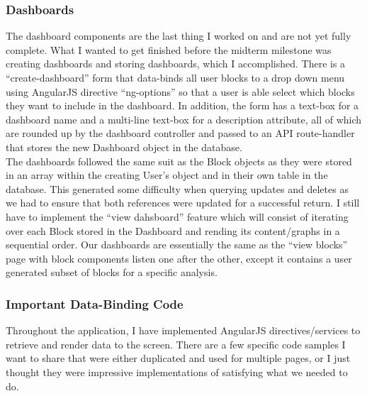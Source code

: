 \documentclass[letterpaper,10pt,serif,draftclsnofoot,onecolumn,compsoc,titlepage]{IEEEtran}
\begin{document}
\subsubsection{Dashboards} 
The dashboard components are the last thing I worked on and are not yet fully complete. What I wanted to get finished before the midterm milestone was creating dashboards and storing dashboards, which I accomplished. There is a ``create-dashboard'' form that data-binds all user blocks to a drop down menu using AngularJS directive ``ng-options'' so that a user is able select which blocks they want to include in the dashboard. In addition, the form has a text-box for a dashboard name and a multi-line text-box for a description attribute, all of which are rounded up by the dashboard controller and passed to an API route-handler that stores the new Dashboard object in the database.\\

\noindent The dashboards followed the same suit as the Block objects as they were stored in an array within the creating User's object and in their own table in the database. This generated some difficulty when querying updates and deletes as we had to ensure that both references were updated for a successful return. I still have to implement the ``view dahsboard'' feature which will consist of iterating over each Block stored in the Dashboard and rending its content/graphs in a sequential order. Our dashboards are essentially the same as the ``view blocks'' page with block components listen one after the other, except it contains a user generated subset of blocks for a specific analysis. 
\subsubsection{Important Data-Binding Code}
Throughout the application, I have implemented AngularJS directives/services to retrieve and render data to the screen. There are a few specific code samples I want to share that were either duplicated and used for multiple pages, or I just thought they were impressive implementations of satisfying what we needed to do.\\
\end{document}
